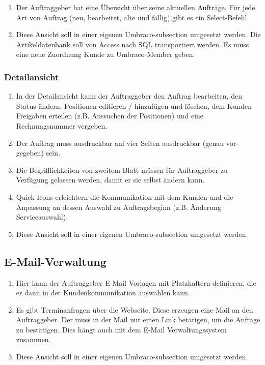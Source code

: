 \begin{enumerate}
	\item Der Auftraggeber hat eine Übersicht über seine aktuellen Aufträge. Für jede Art von Auftrag (neu, bearbeitet, alte und fällig) gibt es ein Select-Befehl.
	\item Diese Ansicht soll in einer eigenen Umbraco-subsection umgesetzt werden. Die Artikeldatenbank soll von Access nach SQL transportiert werden. Es muss eine neue Zuordnung Kunde zu Umbraco-Member geben.
\end{enumerate} 



\subsubsection{Detailansicht}

\begin{enumerate}
	\item In der Detailansicht kann der Auftraggeber den Auftrag bearbeiten, den Status ändern, Positionen editieren / hinzufügen und löschen, dem Kunden Freigaben erteilen (z.B. Aussuchen der Positionen) und eine Rechnungsnummer vergeben.
	\item Der Auftrag muss ausdruckbar auf vier Seiten ausdruckbar (genau vor-gegeben) sein.
	\item Die Begrifflichkeiten von zweitem Blatt müssen für Auftraggeber zu Verfügung gelassen werden, damit er sie selbst ändern kann.
	\item Quick-Icons erleichtern die Kommunikation mit dem Kunden und die Anpassung an dessen Auswahl zu Auftragsbeginn (z.B. Änderung Serviceauswahl).
	\item Diese Ansicht soll in einer eigenen Umbraco-subsection umgesetzt werden.
\end{enumerate} 


\subsection{E-Mail-Verwaltung}

\begin{enumerate}
	\item Hier kann der Auftraggeber E-Mail Vorlagen mit Platzhaltern definieren, die er dann in der Kundenkommunikation auswählen kann.
	\item Es gibt Terminanfragen über die Webseite. Diese erzeugen eine Mail an den Auftraggeber. Der muss in der Mail nur einen Link betätigen, um die Anfrage zu bestätigen. Dies hängt auch mit dem E-Mail Verwaltungssystem zusammen.
	\item Diese Ansicht soll in einer eigenen Umbraco-subsection umgesetzt werden.
\end{enumerate} 



